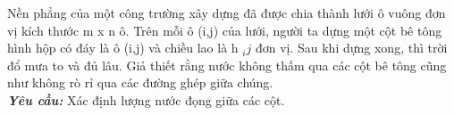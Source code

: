 Nền phẳng của một công trường xây dựng đã được chia thành lưới ô vuông đơn vị kích thước m x n ô. Trên mỗi ô (i,j) của lưới, người ta dựng một cột bê tông hình hộp có đáy là ô (i,j) và chiều lao là h $_ ij $ đơn vị. Sau khi dựng xong, thì trời đổ mưa to và đủ lâu. Giả thiết rằng nước không thấm qua các cột bê tông cũng như không rò rỉ qua các đường ghép giữa chúng.
\\\textbf{\emph{Yêu cầu: }} Xác định lượng nước đọng giữa các cột.